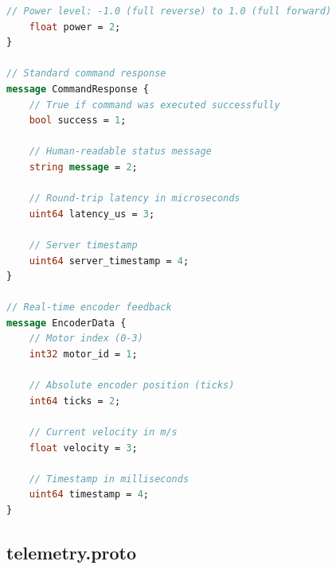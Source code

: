 \documentclass[11pt,letterpaper]{article}
\begin{document}
\begin{lstlisting}[language=Protobuf, caption=star/motor\_control.proto]
    // Power level: -1.0 (full reverse) to 1.0 (full forward)
    float power = 2;
}

// Standard command response
message CommandResponse {
    // True if command was executed successfully
    bool success = 1;

    // Human-readable status message
    string message = 2;

    // Round-trip latency in microseconds
    uint64 latency_us = 3;

    // Server timestamp
    uint64 server_timestamp = 4;
}

// Real-time encoder feedback
message EncoderData {
    // Motor index (0-3)
    int32 motor_id = 1;

    // Absolute encoder position (ticks)
    int64 ticks = 2;

    // Current velocity in m/s
    float velocity = 3;

    // Timestamp in milliseconds
    uint64 timestamp = 4;
}
\end{lstlisting}

\subsection{telemetry.proto}
\end{document}

